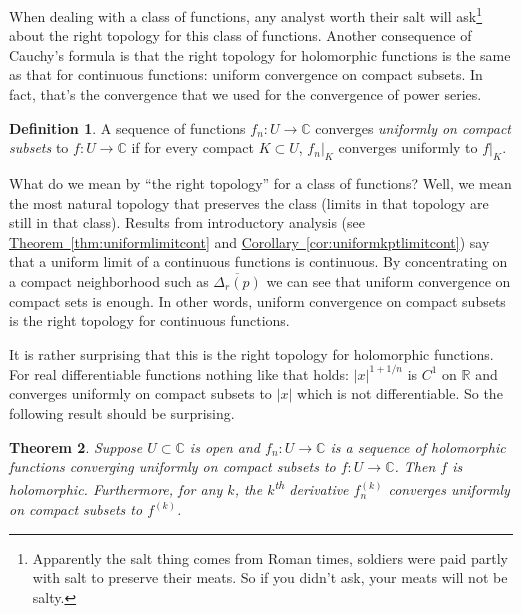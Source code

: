 \documentclass[12pt,openany]{book}
\newcommand{\sabs}[1]{\lvert {#1} \rvert}
\newcommand{\C}{{\mathbb{C}}}
\newcommand{\R}{{\mathbb{R}}}
\newcommand{\myindex}[1]{#1\index{#1}}
\theoremstyle{plain}
\newtheorem{thm}{Theorem}[section]
\theoremstyle{remark}
\theoremstyle{definition}
\newtheorem{defn}[thm]{Definition}
\theoremstyle{exercise}
\theoremstyle{example}
\newcommand{\thmref}[1]{\hyperref[#1]{Theorem~\ref*{#1}}}
\newcommand{\corref}[1]{\hyperref[#1]{Corollary~\ref*{#1}}}
\begin{document}
When dealing with a class of functions, any analyst worth their
salt will ask\footnote{Apparently the salt thing
comes from Roman times, soldiers were
paid partly with salt to preserve their meats.  So if you didn't ask,
your meats will not be salty.} about the right topology for this class of
functions.
Another consequence of Cauchy's formula is that the right topology for
holomorphic functions is the same as that for continuous functions: uniform
convergence on compact subsets.  In fact, that's the convergence that we
used for the convergence of power series.

\begin{defn}
A sequence of functions $f_n \colon U \to \C$ converges
\emph{\myindex{uniformly on compact subsets}}%
to $f \colon U \to \C$ if for every compact $K \subset U$,
$f_n|_K$ converges uniformly to $f|_K$.
\end{defn}

What do we mean by ``the right topology'' for a class of functions?
Well, we mean the most natural
topology that preserves the class (limits in that topology are still in that
class).  
Results from introductory analysis
(see \thmref{thm:uniformlimitcont} and \corref{cor:uniformkptlimitcont})
say that a uniform limit of a continuous functions is continuous.
By concentrating on a compact neighborhood such as $\overline{\Delta_r(p)}$
we can see that uniform convergence on compact sets is enough.
In other words, uniform convergence on compact subsets is the right topology
for continuous functions.

It is rather surprising that this is the right topology for holomorphic
functions.  For real
differentiable functions nothing like that holds: $\sabs{x}^{1+1/n}$
is $C^1$ on $\R$ and converges uniformly on compact subsets to $\sabs{x}$
which is not differentiable.
So the following result should be surprising.

\begin{thm} \label{thm:unifoncompact}
Suppose $U \subset \C$ is open and $f_n \colon U \to \C$ is a sequence
of holomorphic functions converging uniformly on compact subsets to
$f \colon U \to \C$.  Then $f$ is holomorphic.
Furthermore, for any $k$, the $k$\textsuperscript{th} derivative
$f_n^{(k)}$ converges uniformly on compact subsets to $f^{(k)}$.
\end{thm}
\end{document}
